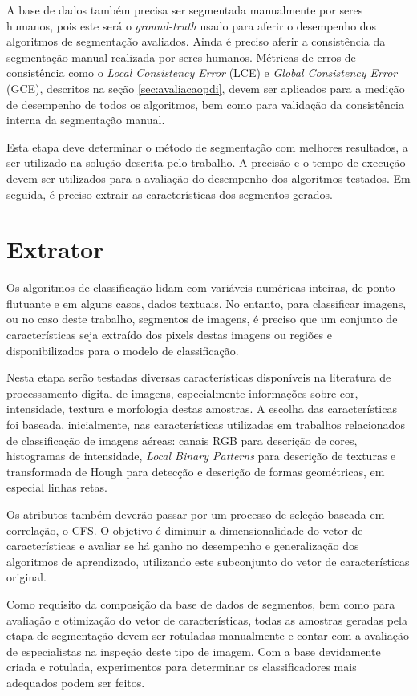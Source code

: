 A base de dados também precisa ser segmentada manualmente por seres humanos, pois este será o \textit{ground-truth} usado para aferir o desempenho dos algoritmos de segmentação avaliados. Ainda é preciso aferir a consistência da segmentação manual realizada por seres humanos. Métricas de erros de consistência como o \textit{Local Consistency Error} (LCE) e \textit{Global Consistency Error} (GCE), descritos na seção \ref{sec:avaliacaopdi}, devem ser aplicados para a medição de desempenho de todos os algoritmos, bem como para validação da consistência interna da segmentação manual.

Esta etapa deve determinar o método de segmentação com melhores resultados, a ser utilizado na solução descrita pelo trabalho. A precisão e o tempo de execução devem ser utilizados para a avaliação do desempenho dos algoritmos testados. Em seguida, é preciso extrair as características dos segmentos gerados.

\section{Extrator}\label{sec:metExtrator}

Os algoritmos de classificação lidam com variáveis numéricas inteiras, de ponto flutuante e em alguns casos, dados textuais. No entanto, para classificar imagens, ou no caso deste trabalho, segmentos de imagens, é preciso que um conjunto de características seja extraído dos pixels destas imagens ou regiões e disponibilizados para o modelo de classificação.

Nesta etapa serão testadas diversas características disponíveis na literatura de processamento digital de imagens, especialmente informações sobre cor, intensidade, textura e morfologia destas amostras. A escolha das características foi baseada, inicialmente, nas características utilizadas em trabalhos relacionados de classificação de imagens aéreas: canais RGB para descrição de cores, histogramas de intensidade, \textit{Local Binary Patterns} para descrição de texturas e transformada de Hough para detecção e descrição de formas geométricas, em especial linhas retas.

Os atributos também deverão passar por um processo de seleção baseada em correlação, o CFS. O objetivo é diminuir a dimensionalidade do vetor de características e avaliar se há ganho no desempenho e generalização dos algoritmos de aprendizado, utilizando este subconjunto do vetor de características original.

Como requisito da composição da base de dados de segmentos, bem como para avaliação e otimização do vetor de características, todas as amostras geradas pela etapa de segmentação devem ser rotuladas manualmente e contar com a avaliação de especialistas na inspeção deste tipo de imagem. Com a base devidamente criada e rotulada, experimentos para determinar os classificadores mais adequados podem ser feitos.

